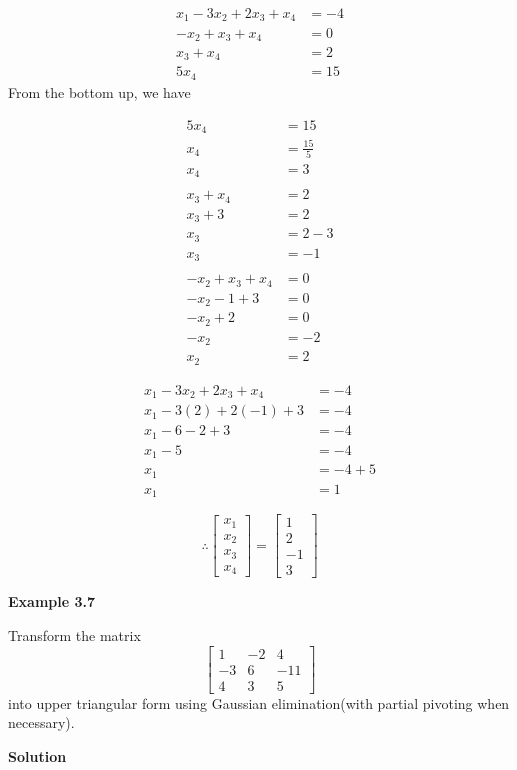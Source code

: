 \documentclass[a4paper, 12pt]{report}
\begin{document}
{     \begin{align*}
     x_1-3x_2+2x_3+x_4&=-4\\
     -x_2+x_3+x_4&=0\\
     x_3+x_4&=2\\
     5x_4&=15
     \end{align*}
     From the bottom up, we have
     
     \begin{align*}
     5x_4&=15\\
     x_4&=\frac{15}{5}\\
     x_4&=3\\
     \\
     x_3+x_4&=2\\
     x_3+3&=2\\
     x_3&=2-3\\
     x_3&=-1\\
     \\
     -x_2+x_3+x_4&=0\\
     -x_2-1+3&=0\\
     -x_2+2&=0\\
     -x_2&=-2\\
     x_2&=2
     \end{align*}
     
     \begin{align*}
     x_1-3x_2+2x_3+x_4&=-4\\
     x_1-3(2)+2(-1)+3&=-4\\
     x_1-6-2+3&=-4\\
     x_1-5&=-4\\
     x_1&=-4+5\\
     x_1&=1
     \end{align*}
     
     \begin{equation*}
     \therefore
     \begin{bmatrix} x_1\\ x_2\\ x_3\\ x_4 \end{bmatrix}
     =
     \begin{bmatrix} 1\\ 2\\ -1\\ 3 \end{bmatrix}
     \end{equation*}
 
     \begin{center}
     	\textbf{Example 3.7}
     \end{center}
      Transform the matrix    
     \begin{equation*}
     \begin{bmatrix} 1& -2& 4\\ -3& 6& -11\\ 4& 3& 5 \end{bmatrix}
     \end{equation*}
     into upper triangular form using Gaussian elimination(with partial pivoting when necessary).\\
     \begin{center}
     	\textbf{Solution}
     \end{center}
     
}
\end{document}
